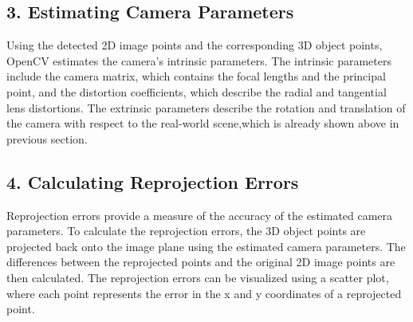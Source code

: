 \documentclass{article}
\begin{document}
\subsection*{3. Estimating Camera Parameters}
Using the detected 2D image points and the corresponding 3D object points, 
OpenCV estimates the camera's intrinsic parameters. 
The intrinsic parameters include the camera matrix, 
which contains the focal lengths and the principal point, 
and the distortion coefficients, 
which describe the radial and tangential lens distortions. 
The extrinsic parameters describe the rotation and translation of 
the camera with respect to the real-world scene,which is already shown above in previous 
section.

\subsection*{4. Calculating Reprojection Errors}
Reprojection errors provide a measure of the accuracy of the estimated camera parameters. 
To calculate the reprojection errors, 
the 3D object points are projected back onto the 
image plane using the estimated camera parameters. 
The differences between the reprojected 
points and the original 2D image points are then calculated. 
The reprojection errors can be visualized using a scatter plot, 
where each point represents the error 
in the x and y coordinates of a reprojected point.
\end{document}
